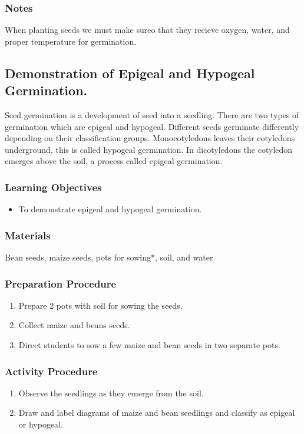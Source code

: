 \subsubsection*{Notes}
When planting seeds we must make sureo that they recieve oxygen, water, and proper temperature for germination.


\subsection{Demonstration of Epigeal and Hypogeal Germination.}
Seed germination is a development of seed into a seedling. There are two types of germination which are epigeal and hypogeal. Different seeds germinate differently depending on their classification groups.  Monocotyledons leaves their cotyledons underground, this is called hypogeal germination. In dicotyledons the cotyledon emerges above the soil, a process called epigeal germination.

\subsubsection*{Learning Objectives}
\begin{itemize}
\item{To demonstrate epigeal and hypogeal germination.}
\end{itemize}



\subsubsection*{Materials}
Bean seeds, maize seeds, pots for sowing*, soil, and water

\subsubsection*{Preparation Procedure}
\begin{enumerate}
\item{Prepare 2 pots with soil for sowing the seeds.}
\item{Collect maize and beans seeds.}
\item{Direct students to sow a few maize and bean seeds in two separate pots.}
\end{enumerate}

\subsubsection*{Activity Procedure}
\begin{enumerate}
\item{Observe the seedlings as they emerge from the soil.}
\item{Draw and label diagrams of maize and bean seedlings and classify as epigeal or hypogeal.}
\end{enumerate}

